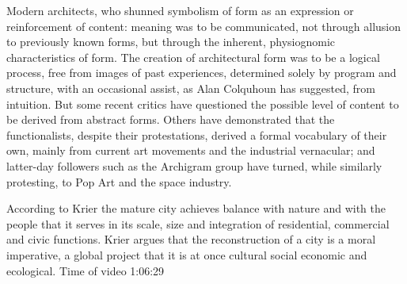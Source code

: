

     Modern architects, who shunned symbolism of form  as  an expression or reinforcement of content: meaning was  to  be  communicated,  not  through  allusion  to  previously  known forms, but through the inherent, physiognomic characteristics of form.
    The creation of architectural form was to be a logical process, free  from images  of past experiences, determined solely by program and structure, with an  occasional  assist,  as  Alan Colquhoun has  suggested, from  intuition.
    But some recent critics  have  questioned  the possible level of content to  be derived  from  abstract forms.
    Others have  demonstrated that the functionalists,  despite  their protestations, derived  a  formal vocabulary of their own, mainly from current art movements and the industrial vernacular;
    and  latter-day  followers  such  as  the  Archigram  group  have turned,  while  similarly  protesting,  to Pop  Art and  the space  industry.\cite{Venturi1972}

    According to Krier the mature city achieves balance with nature and with the people that it serves in its scale, size and integration of residential, commercial and civic functions.
    Krier argues that the reconstruction of a city is a moral imperative, a global project that it is at once cultural social economic and ecological. Time of video 1:06:29\cite{Economakis2023}